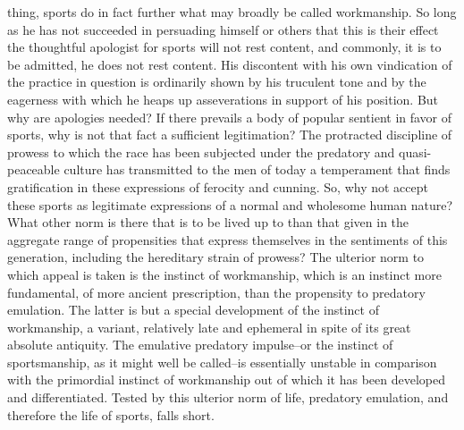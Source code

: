 \documentclass[12pt]{report}
\begin{document}
thing, sports do in fact further what may broadly be called workmanship.
So long as he has not succeeded in persuading himself or others that
this is their effect the thoughtful apologist for sports will not rest
content, and commonly, it is to be admitted, he does not rest content.
His discontent with his own vindication of the practice in question is
ordinarily shown by his truculent tone and by the eagerness with which
he heaps up asseverations in support of his position. But why are
apologies needed? If there prevails a body of popular sentient in
favor of sports, why is not that fact a sufficient legitimation? The
protracted discipline of prowess to which the race has been subjected
under the predatory and quasi-peaceable culture has transmitted to the
men of today a temperament that finds gratification in these expressions
of ferocity and cunning. So, why not accept these sports as legitimate
expressions of a normal and wholesome human nature? What other norm is
there that is to be lived up to than that given in the aggregate range
of propensities that express themselves in the sentiments of this
generation, including the hereditary strain of prowess? The ulterior
norm to which appeal is taken is the instinct of workmanship, which is
an instinct more fundamental, of more ancient prescription, than
the propensity to predatory emulation. The latter is but a special
development of the instinct of workmanship, a variant, relatively late
and ephemeral in spite of its great absolute antiquity. The emulative
predatory impulse--or the instinct of sportsmanship, as it might well
be called--is essentially unstable in comparison with the primordial
instinct of workmanship out of which it has been developed and
differentiated. Tested by this ulterior norm of life, predatory
emulation, and therefore the life of sports, falls short.
\end{document}
